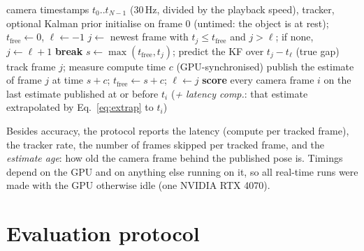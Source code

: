 \documentclass[10pt,a4paper]{article}
\begin{document}
\begin{algorithm}[t]
\caption{Real-time evaluation (\texttt{common.evaluate.track\_realtime})}
\label{alg:rt}
\begin{algorithmic}[1]
\Require camera timestamps $t_0..t_{N-1}$ (30\,Hz, divided by the playback speed), tracker, optional Kalman prior
\State initialise on frame 0 (untimed: the object is at rest); $t_{\text{free}} \gets 0$, $\ell \gets -1$
  \State $j \gets$ newest frame with $t_j \le t_{\text{free}}$ and $j>\ell$; if none, $j \gets \ell+1$ 
   \textbf{break} \EndIf
  \State $s \gets \max(t_{\text{free}}, t_j)$; predict the KF over $t_j - t_\ell$ (true gap)
  \State track frame $j$; measure compute time $c$ (GPU-synchronised)
  \State publish the estimate of frame $j$ at time $s + c$; $t_{\text{free}} \gets s+c$; $\ell \gets j$
\EndWhile
\State \textbf{score} every camera frame $i$ on the last estimate published at or before $t_i$
\State {} (\textit{+ latency comp.}: that estimate extrapolated by Eq.~\eqref{eq:extrap} to $t_i$)
\end{algorithmic}
\end{algorithm}

Besides accuracy, the protocol reports the latency (compute per tracked frame),
the tracker rate, the number of frames skipped per tracked frame, and the
\emph{estimate age}: how old the camera frame behind the published pose is.
Timings depend on the GPU and on anything else running on it, so all real-time
runs were made with the GPU otherwise idle (one NVIDIA RTX 4070).

\section{Evaluation protocol}
\label{sec:eval}
\end{document}
